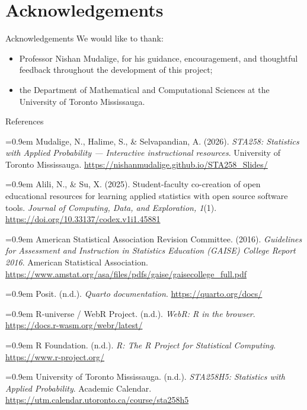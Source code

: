 \documentclass[aspectratio=169,10pt]{beamer}
\begin{document}
\section{Acknowledgements}
\begin{frame}{Acknowledgements}
\vspace{0.9em}
\large
We would like to thank:
\vspace{0.4em}
\begin{itemize}\setlength{\itemsep}{0.55em}
  \item Professor Nishan Mudalige, for his guidance, encouragement, and thoughtful feedback throughout the development of this project;
  \item the Department of Mathematical and Computational Sciences at the University of Toronto Mississauga.
\end{itemize}
\end{frame}

\newcommand{\refentry}[1]{\par\hangindent=0.9em\hangafter=1 #1\par\vspace{0.55em}}
\begin{frame}{References}
\vspace{0.5em}
\scriptsize
\refentry{Mudalige, N., Halime, S., \& Selvapandian, A. (2026). \textit{STA258: Statistics with Applied Probability --- Interactive instructional resources}. University of Toronto Mississauga. \url{https://nishanmudalige.github.io/STA258_Slides/}}
\refentry{Alili, N., \& Su, X. (2025). Student-faculty co-creation of open educational resources for learning applied statistics with open source software tools. \textit{Journal of Computing, Data, and Exploration, 1}(1). \url{https://doi.org/10.33137/codex.v1i1.45881}}
\refentry{American Statistical Association Revision Committee. (2016). \textit{Guidelines for Assessment and Instruction in Statistics Education (GAISE) College Report 2016}. American Statistical Association. \url{https://www.amstat.org/asa/files/pdfs/gaise/gaisecollege_full.pdf}}
\refentry{Posit. (n.d.). \textit{Quarto documentation}. \url{https://quarto.org/docs/}}
\refentry{R-universe / WebR Project. (n.d.). \textit{WebR: R in the browser}. \url{https://docs.r-wasm.org/webr/latest/}}
\refentry{R Foundation. (n.d.). \textit{R: The R Project for Statistical Computing}. \url{https://www.r-project.org/}}
\refentry{University of Toronto Mississauga. (n.d.). \textit{STA258H5: Statistics with Applied Probability}. Academic Calendar. \url{https://utm.calendar.utoronto.ca/course/sta258h5}}
\end{frame}
\end{document}
